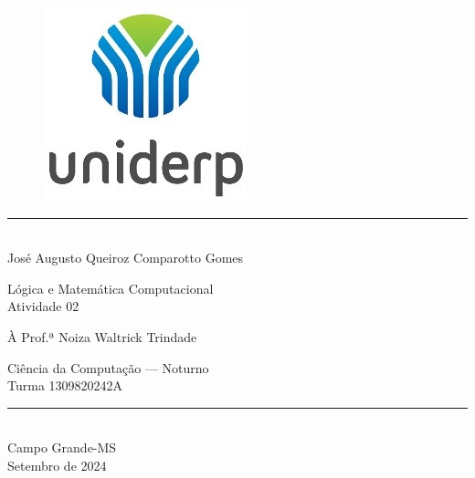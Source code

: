 \documentclass[12pt,letterpaper, onecolumn]{exam}
\author{\authorfullname}
\title{\subject: \assignment}
\newcommand{\subject}{Lógica e Matemática Computacional}
\newcommand{\assignment}{Atividade 02}
\newcommand{\authorfullname}{José Augusto Queiroz Comparotto Gomes}
\newcommand{\professor}{Prof.ª Noiza Waltrick Trindade}
\newcommand{\course}{Ciência da Computação — Noturno}
\newcommand{\classno}{1309820242A}
\newcommand{\location}{Campo Grande-MS}
\newcommand{\documentdate}{Setembro de 2024}
\begin{document}
\begingroup  

    \centering
    \begin{figure}
        \centering
        \includegraphics[width=0.15\linewidth]{assets/uniderp.jpg}
        \label{fig:university-logo}
    \end{figure}
    
    \rule{\textwidth}{2pt}  \\[1em]
    
    \LARGE \authorfullname

    \vfill
    
    \LARGE \subject     \\
    \LARGE \assignment
    
    \vfill
    
    \large À \professor \\

    \vfill
    
    \large \course          \\
    \large Turma \classno   \\[1em]
    
    \rule{\textwidth}{2pt}  \\[1em]

    \large \location        \\
    \large \documentdate    \\
    
    \pagebreak
\endgroup

\pointsdroppedatright   %
\printanswers
\renewcommand{\solutiontitle}{\noindent\textbf{Resposta:}\enspace}  
\end{document}
